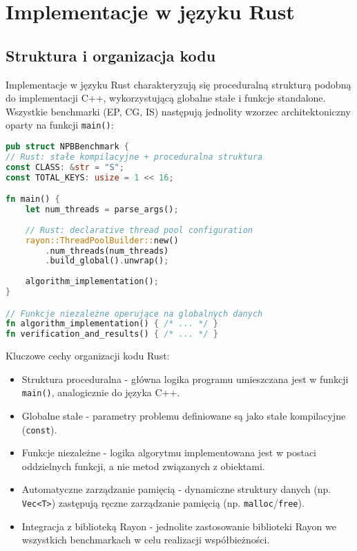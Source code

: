 \section{Implementacje w języku Rust}
\subsection{Struktura i organizacja kodu}
Implementacje w języku Rust charakteryzują się proceduralną strukturą podobną do implementacji C++, wykorzystującą globalne stałe i funkcje standalone. Wszystkie benchmarki (EP, CG, IS) następują jednolity wzorzec architektoniczny oparty na funkcji \texttt{main()}:

\begin{lstlisting}[language=Rust, caption={Struktura kodu benchmarków w języku Rust}, label={lst:rust_structure}]
pub struct NPBBenchmark {
// Rust: stałe kompilacyjne + proceduralna struktura
const CLASS: &str = "S";
const TOTAL_KEYS: usize = 1 << 16;

fn main() {
    let num_threads = parse_args();
    
    // Rust: declarative thread pool configuration
    rayon::ThreadPoolBuilder::new()
        .num_threads(num_threads)
        .build_global().unwrap();
    
    algorithm_implementation();
}

// Funkcje niezależne operujące na globalnych danych
fn algorithm_implementation() { /* ... */ }
fn verification_and_results() { /* ... */ }
\end{lstlisting}
Kluczowe cechy organizacji kodu Rust:
\begin{itemize}
\item Struktura proceduralna - główna logika programu umieszczana jest w funkcji \texttt{main()}, analogicznie do języka C++.
\item Globalne stałe - parametry problemu definiowane są jako stałe kompilacyjne (\texttt{const}).
\item Funkcje niezależne - logika algorytmu implementowana jest w postaci oddzielnych funkcji, a nie metod związanych z obiektami.
\item Automatyczne zarządzanie pamięcią - dynamiczne struktury danych (np. \texttt{Vec<T>}) zastępują ręczne zarządzanie pamięcią (np. \texttt{malloc}/\texttt{free}).
\item Integracja z biblioteką Rayon - jednolite zastosowanie biblioteki Rayon we wszystkich benchmarkach w celu realizacji współbieżności.
\end{itemize}


